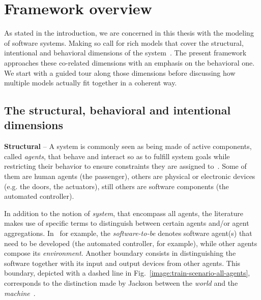 \section{Framework overview\label{section:background-multi-agent-systems-and-behavior-modeling}}

As stated in the introduction, we are concerned in this thesis with the modeling of software systems. Making so call for rich models that cover the structural, intentional and behavioral dimensions of the system~\cite{VanLamsweerde:2000}. The present framework approaches these co-related dimensions with an emphasis on the behavioral one. We start with a guided tour along those dimensions before discussing how multiple models actually fit together in a coherent way.

\subsection{The structural, behavioral and intentional dimensions}

\noindent \textbf{Structural} -- A system is commonly seen as being made of active components, called \emph{agents}, that behave and interact so as to fulfill system goals while restricting their behavior to ensure constraints they are assigned to~\cite{Feather:1987}. Some of them are human agents (the passenger), others are physical or electronic devices (e.g. the doors, the actuators), still others are software components (the automated controller).

In addition to the notion of \emph{system}, that encompass all agents, the literature makes use of specific terms to distinguish between certain agents and/or agent aggregations. In~\cite{VanLamsweerde:2009} for example, the \emph{software-to-be} denotes software agent(s) that need to be developed (the automated controller, for example), while other agents compose its \emph{environment}. Another boundary consists in distinguishing the software together with its input and output devices from other agents. This boundary, depicted with a dashed line in Fig.~\ref{image:train-scenario-all-agents}, corresponds to the distinction made by Jackson between the \emph{world} and the \emph{machine}~\cite{Jackson:1995}.

